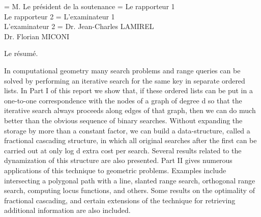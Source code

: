 \documentclass[11pt]{thesul}
\begin{document}


\ThesisUL

\President={
M. Le président de la soutenance
}
\Rapporteurs ={
Le rapporteur 1\\
Le rapporteur 2
}
\Examinateurs={
L'examinateur 1\\
L'examinateur 2
}
\Encadrants={
Dr. Jean-Charles LAMIREL\\
Dr. Florian MICONI
}

\MakeThesisTitlePage



\NumberAbstractPages
\begin{ThesisAbstract}

    \begin{FrenchAbstract}
        Le résumé.
    \end{FrenchAbstract}

    \begin{EnglishAbstract}
        In computational geometry many search problems and range queries can be solved by performing an iterative search for the same key in separate ordered lists.  In Part I of this report we show that, if these ordered lists can be put in a one-to-one correspondence with the nodes of a graph of degree  d  so that the iterative search always proceeds along edges of that graph, then we can do much better than the obvious sequence of binary searches. Without expanding the storage by more than a constant factor, we can build a data-structure, called a fractional cascading structure, in which all original searches after the first can be carried out at only  log d  extra cost per search.  Several results related to the dynamization of this structure are also presented. Part II gives  numerous applications of this technique to geometric problems.
        Examples include intersecting a polygonal path with a line, slanted range search, orthogonal range search, computing locus functions, and others. Some results on the optimality of fractional cascading, and certain extensions of the technique for retrieving additional information are also included.
    \end{EnglishAbstract}
\end{ThesisAbstract}
\end{document}
